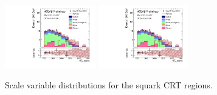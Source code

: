 \begin{figure}[tbph]
\begin{center}
\includegraphics[width=0.35\textwidth]{figures/ATLAS-CONF-2016-078_INT/N-1Plots/AtlasStyle/Preliminary/CRT_SRJigsawSRS3a_LastCut_CRT_minusone}
\includegraphics[width=0.35\textwidth]{figures/ATLAS-CONF-2016-078_INT/N-1Plots/AtlasStyle/Preliminary/CRT_SRJigsawSRS3b_LastCut_CRT_minusone}
\end{center}
\caption{Scale variable distributions for the squark CRT regions.}
\label{fig:CRT_SRJigsawSRS2a_LastCut_CRT_minusone}
\end{figure}

